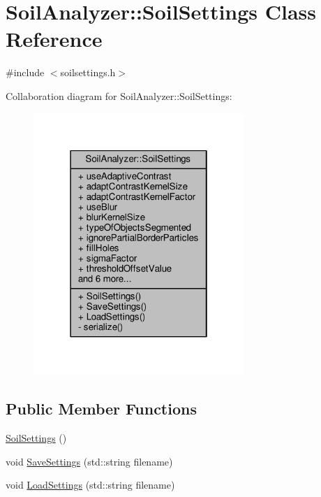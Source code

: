 \hypertarget{class_soil_analyzer_1_1_soil_settings}{}\section{Soil\+Analyzer\+:\+:Soil\+Settings Class Reference}
\label{class_soil_analyzer_1_1_soil_settings}


{\ttfamily \#include $<$soilsettings.\+h$>$}



Collaboration diagram for Soil\+Analyzer\+:\+:Soil\+Settings\+:\nopagebreak
\begin{figure}[H]
\begin{center}
\leavevmode
\includegraphics[width=226pt]{class_soil_analyzer_1_1_soil_settings__coll__graph}
\end{center}
\end{figure}
\subsection*{Public Member Functions}
\begin{DoxyCompactItemize}
\item 
\hyperlink{class_soil_analyzer_1_1_soil_settings_ab8359b9a5ea27e6296e79a82789c8719}{Soil\+Settings} ()
\item 
void \hyperlink{class_soil_analyzer_1_1_soil_settings_ab211c361df454e8e1e29a4bddedeba81}{Save\+Settings} (std\+::string filename)
\item 
void \hyperlink{class_soil_analyzer_1_1_soil_settings_a438bf660eeb7a49a676eef5da129f8d5}{Load\+Settings} (std\+::string filename)
\end{DoxyCompactItemize}
